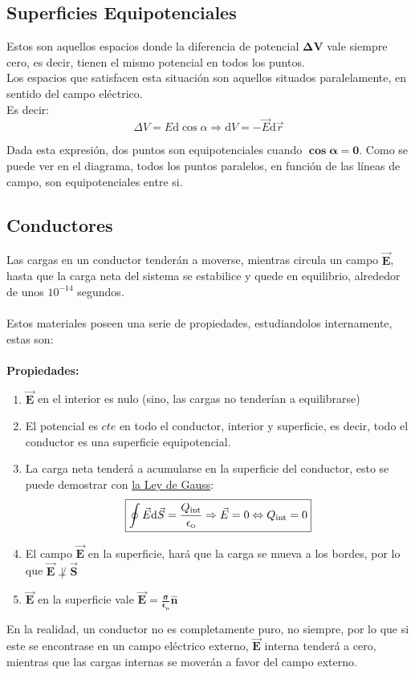 \subsection{Superficies Equipotenciales}
\noindent Estos son aquellos espacios donde la diferencia de potencial \(\bm{\Delta V}\) vale siempre cero, es decir, tienen el mismo potencial en todos los puntos. \\
Los espacios que satisfacen esta situación son aquellos situados paralelamente, en sentido del campo eléctrico. \\ Es decir:
\[
        \boxed{\Delta V = E \mathrm{d} \cos{\alpha} \Rightarrow \mathrm{d}V = - \vec{E}\mathrm{d}\vec{r}}
\]
\begin{wrapfigure}{r}{5cm}
        
\end{wrapfigure}
Dada esta expresión, dos puntos son equipotenciales cuando \(\bm{\cos{\bm{\alpha}} = 0}\). Como se puede ver en el diagrama, todos los puntos paralelos, en función de las líneas de campo, son equipotenciales entre si.
\subsection{Conductores}
\noindent Las cargas en un conductor tenderán a moverse, mientras circula un campo \(\bm{\vec{E}}\), hasta que la carga neta del sistema se estabilice y quede en equilibrio, alrededor de unos \(10^{-14}\) segundos.\\\\
Estos materiales poseen una serie de propiedades, estudiandolos internamente, estas son:\\\\
\hspace{3cm}\textbf{Propiedades:}
\begin{enumerate}
        \item \(\bm{\vec{E}}\) en el interior es nulo (sino, las cargas no tenderían a equilibrarse)
        \item  El potencial es \(cte\) en todo el conductor, interior y superficie, es decir, todo el conductor es una superficie equipotencial.
        \item La carga neta tenderá a acumularse en la superficie del conductor, esto se puede demostrar con \underline{la Ley de Gauss}:
              \[
                      \boxed{\oint \vec{E} \mathrm{d} \vec{S} = \frac{Q_{\textnormal{int}}}{\epsilon_{\textnormal{o}}} \Rightarrow \vec{E} = 0 \Leftrightarrow  Q_{\textnormal{int}} = 0}
              \]
        \item El campo \(\bm{\vec{E}}\) en la superficie, hará que la carga se mueva a los bordes, por lo que \(\bm{\vec{E} \not \perp \vec{S}}\)
        \item \(\bm{\vec{E}}\) en la superficie vale \(\bm{\vec{E} = \frac{\sigma}{\epsilon_o}\hat{n}}\)
\end{enumerate}
\vspace{0.5cm}
En la realidad, un conductor no es completamente puro, no siempre, por lo que si este se encontrase en un campo eléctrico externo, \(\bm{\vec{E}}\) interna tenderá a cero, mientras que las cargas internas se moverán a favor del campo externo.
